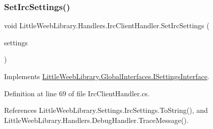 \subsubsection{\texorpdfstring{Set\+Irc\+Settings()}{SetIrcSettings()}}
{\footnotesize\ttfamily void Little\+Weeb\+Library.\+Handlers.\+Irc\+Client\+Handler.\+Set\+Irc\+Settings (\begin{DoxyParamCaption}\item[{\mbox{\hyperlink{class_little_weeb_library_1_1_settings_1_1_irc_settings}{Irc\+Settings}}}]{settings }\end{DoxyParamCaption})}



Implements \mbox{\hyperlink{interface_little_weeb_library_1_1_global_interfaces_1_1_i_settings_interface_a9ddf06e247a96d757482b37ddb070e3d}{Little\+Weeb\+Library.\+Global\+Interfaces.\+I\+Settings\+Interface}}.



Definition at line 69 of file Irc\+Client\+Handler.\+cs.



References Little\+Weeb\+Library.\+Settings.\+Irc\+Settings.\+To\+String(), and Little\+Weeb\+Library.\+Handlers.\+Debug\+Handler.\+Trace\+Message().


